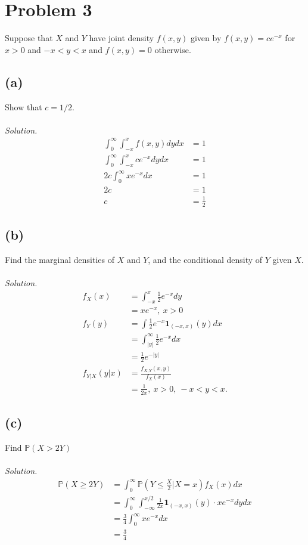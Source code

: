 \documentclass{article}
\newcommand{\prob}{\mathbb{P}}
\begin{document}
\section*{Problem 3}
Suppose that $X$ and $Y$ have joint density $f(x,y)$ given by $f(x,y)=ce^{-x}$ for $x>0$ and $-x<y<x$ and $f(x,y) = 0$ otherwise.
\subsection*{(a)}
Show that $c = 1/2$.
\color{blue}
\\\\\textit{Solution. }
\begin{equation*}
    \begin{split}
        \int_0^\infty\int_{-x}^{x}f(x,y)dydx &=1\\
        \int_0^\infty\int_{-x}^{x}ce^{-x}dydx &=1\\
        2c\int_0^\infty xe^{-x}dx &=1\\
        2c &= 1\\
        c &=\frac{1}{2}
    \end{split}
\end{equation*}
\color{black}
\subsection*{(b)}
Find the marginal densities of $X$ and $Y$, and the conditional density of $Y$ given $X$.
\color{blue}
\\\\\textit{Solution. }
\begin{equation*}
    \begin{split}
        f_X(x) &= \int_{-x}^x \frac{1}{2}e^{-x}dy\\
        &= xe^{-x},\ x>0\\
        f_Y(y) &= \int \frac{1}{2}e^{-x}\mathbf{1}_{(-x,x)}(y)dx\\
        &=\int_{|y|}^{\infty}\frac{1}{2}e^{-x}dx\\
        &=\frac{1}{2}e^{-|y|}\\
        f_{Y\vert X}(y\vert x) &=\frac{f_{X,Y}(x,y)}{f_X(x)}\\
        &=\frac{1}{2x},\ x>0,\ -x<y<x.
    \end{split}
\end{equation*}
\color{black}
\subsection*{(c)}
Find $\prob(X>2Y)$
\color{blue}
\\\\\textit{Solution. }
\begin{equation*}
    \begin{split}
        \prob(X\geq 2Y) &=\int_0^\infty\prob\left(Y\leq\frac{X}{2}\vert X=x\right)f_X(x)dx\\
        &=\int_0^\infty\int_{-\infty}^{x/2}\frac{1}{2x}\mathbf{1}_{(-x,x)}(y)\cdot xe^{-x}dydx\\
        &=\frac{3}{4}\int_0^\infty xe^{-x}dx\\
        &=\frac{3}{4}
    \end{split}
\end{equation*}
\end{document}
